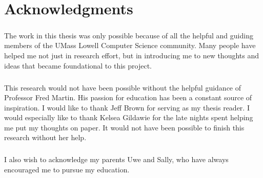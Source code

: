 \chapter*{Acknowledgments}
\renewcommand{\thefootnote}{\fnsymbol{footnote}}

\paragraph{}
 The work in this thesis was only possible because of all the helpful and guiding members of the UMass Lowell Computer Science community. 
 Many people have helped me not just in research effort, but in introducing me to new thoughts and ideas that became foundational to this project. 

\paragraph{}
This research would not have been possible without the helpful guidance of Professor Fred Martin.
His passion for education has been a constant source of inspiration.
I would like to thank Jeff Brown for serving as my thesis reader.
I would especially like to thank Kelsea Gildawie for the late nights spent helping me put my thoughts on paper.
It would not have been possible to finish this research without her help.

\paragraph{}
I also wish to acknowledge my parents Uwe and Sally, who have always encouraged me to pursue my education.